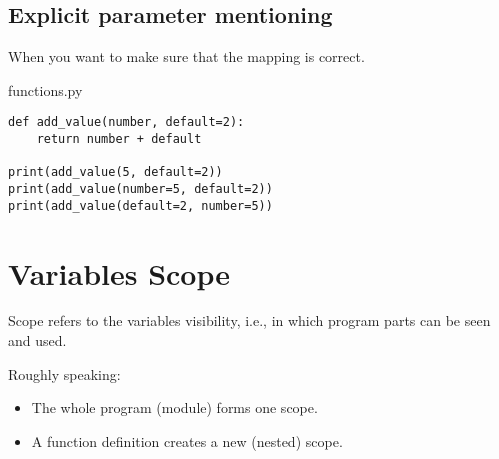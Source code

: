 \documentclass[aspectratio=1610,slidestop]{beamer}
\begin{document}
\subsection{Explicit parameter mentioning}
\begin{pframe}
 When you want to make sure that the mapping is correct.
 \medskip

 \begin{minipage}[t]{0.51\textwidth}
  \begin{pythonfile}{functions.py}
   \begin{verbatim}
def add_value(number, default=2):
    return number + default

print(add_value(5, default=2))
print(add_value(number=5, default=2))
print(add_value(default=2, number=5))
   \end{verbatim}
  \end{pythonfile}
 \end{minipage}\qquad
 \begin{minipage}[t]{0.43\textwidth}
  \vspace{-3.45cm}
  \begin{terminal}
  \end{terminal}
 \end{minipage}
\end{pframe}


\section{Variables Scope}

\begin{pframe}
 Scope refers to the variables visibility, i.e., in which program parts can be seen and used.
 \medskip
 \pause

  Roughly speaking:
  \begin{itemize}
   \item The whole program (module) forms one scope.
   \item A function definition creates a new (nested) scope.
 \end{itemize}
\end{pframe}
\end{document}

